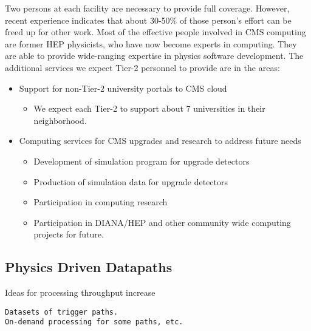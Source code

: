 Two persons at each facility are necessary to provide full coverage.  However,
recent experience indicates that about 30-50\% of those person's effort can be
freed up for other work. Most of the effective people involved in CMS computing
are former HEP physicists, who have now become experts in computing. They
are able to provide wide-ranging expertise in physics software development.
The additional services we expect Tier-2 personnel to provide are in the areas:
\begin{itemize}
\item Support for non-Tier-2 university portals to CMS cloud
\begin{itemize}
\item We expect each Tier-2 to support about 7 universities in their neighborhood.
\end{itemize}
\item Computing services for CMS upgrades and research to address future needs
\begin{itemize}
\item Development of simulation program for upgrade detectors
\item Production of simulation data for upgrade detectors
\item Participation in computing research
\item Participation in DIANA/HEP and other community wide computing projects for future.
\end{itemize}
\end{itemize} 

\subsection{Physics Driven Datapaths}



Ideas for processing throughput increase
\begin{verbatim}
Datasets of trigger paths.
On-demand processing for some paths, etc.
\end{verbatim}
